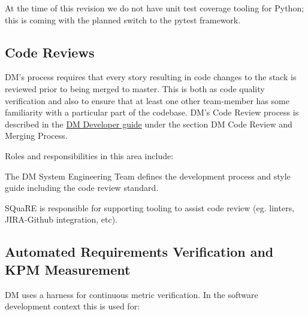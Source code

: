 At the time of this revision we do not have unit test coverage tooling for Python; this is coming with the planned switch to the pytest framework. 

\subsection{Code Reviews}

DM’s process requires that every story resulting in code changes to the stack is reviewed prior to being merged to master. This is both as code quality verification and also to ensure that at least one other team-member has some familiarity with a particular part of the codebase. DM’s Code Review process is described in the \href{https://developer.lsst.io}{DM Developer guide} under the section DM Code Review and Merging Process.

Roles and responsibilities in this area include:

\begin{itemize_single}

\item The DM System Engineering Team  defines the development process and style guide including the code review standard.

\item SQuaRE is responsible for supporting tooling to assist code review (eg. linters, JIRA-Github integration, etc). 

\end{itemize_single}
  
\subsection{Automated Requirements Verification and KPM Measurement}

DM uses a harness for continuous metric verification. In the software development context this is used for:

